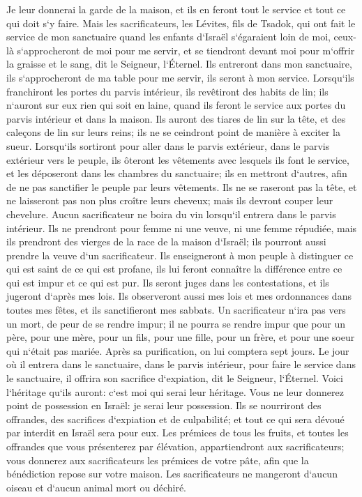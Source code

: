 \verse Je leur donnerai la garde de la maison, et ils en feront tout le service et tout ce qui doit s`y faire. 
\verse Mais les sacrificateurs, les Lévites, fils de Tsadok, qui ont fait le service de mon sanctuaire quand les enfants d`Israël s`égaraient loin de moi, ceux-là s`approcheront de moi pour me servir, et se tiendront devant moi pour m`offrir la graisse et le sang, dit le Seigneur, l`Éternel. 
\verse Ils entreront dans mon sanctuaire, ils s`approcheront de ma table pour me servir, ils seront à mon service. 
\verse Lorsqu`ils franchiront les portes du parvis intérieur, ils revêtiront des habits de lin; ils n`auront sur eux rien qui soit en laine, quand ils feront le service aux portes du parvis intérieur et dans la maison. 
\verse Ils auront des tiares de lin sur la tête, et des caleçons de lin sur leurs reins; ils ne se ceindront point de manière à exciter la sueur. 
\verse Lorsqu`ils sortiront pour aller dans le parvis extérieur, dans le parvis extérieur vers le peuple, ils ôteront les vêtements avec lesquels ils font le service, et les déposeront dans les chambres du sanctuaire; ils en mettront d`autres, afin de ne pas sanctifier le peuple par leurs vêtements. 
\verse Ils ne se raseront pas la tête, et ne laisseront pas non plus croître leurs cheveux; mais ils devront couper leur chevelure. 
\verse Aucun sacrificateur ne boira du vin lorsqu`il entrera dans le parvis intérieur. 
\verse Ils ne prendront pour femme ni une veuve, ni une femme répudiée, mais ils prendront des vierges de la race de la maison d`Israël; ils pourront aussi prendre la veuve d`un sacrificateur. 
\verse Ils enseigneront à mon peuple à distinguer ce qui est saint de ce qui est profane, ils lui feront connaître la différence entre ce qui est impur et ce qui est pur. 
\verse Ils seront juges dans les contestations, et ils jugeront d`après mes lois. Ils observeront aussi mes lois et mes ordonnances dans toutes mes fêtes, et ils sanctifieront mes sabbats. 
\verse Un sacrificateur n`ira pas vers un mort, de peur de se rendre impur; il ne pourra se rendre impur que pour un père, pour une mère, pour un fils, pour une fille, pour un frère, et pour une soeur qui n`était pas mariée. 
\verse Après sa purification, on lui comptera sept jours. 
\verse Le jour où il entrera dans le sanctuaire, dans le parvis intérieur, pour faire le service dans le sanctuaire, il offrira son sacrifice d`expiation, dit le Seigneur, l`Éternel. 
\verse Voici l`héritage qu`ils auront: c`est moi qui serai leur héritage. Vous ne leur donnerez point de possession en Israël: je serai leur possession. 
\verse Ils se nourriront des offrandes, des sacrifices d`expiation et de culpabilité; et tout ce qui sera dévoué par interdit en Israël sera pour eux. 
\verse Les prémices de tous les fruits, et toutes les offrandes que vous présenterez par élévation, appartiendront aux sacrificateurs; vous donnerez aux sacrificateurs les prémices de votre pâte, afin que la bénédiction repose sur votre maison. 
\verse Les sacrificateurs ne mangeront d`aucun oiseau et d`aucun animal mort ou déchiré. 

